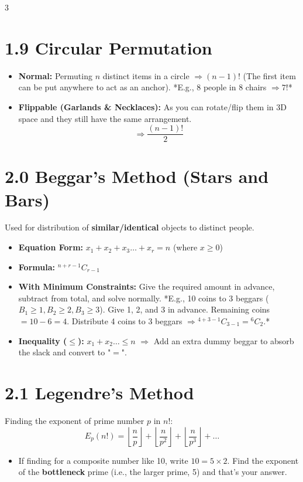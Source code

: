 \documentclass[11pt,a4paper,landscape]{article}
\begin{document}
\begin{multicols*}{3}
\section*{1.9 Circular Permutation}
\begin{itemize}
\item \textbf{Normal:} Permuting $n$ distinct items in a circle $\Rightarrow (n-1)!$ (The first item can be put anywhere to act as an anchor).
  *E.g., 8 people in 8 chairs $\Rightarrow 7!$*
\item \textbf{Flippable (Garlands \& Necklaces):} As you can rotate/flip them in 3D space and they still have the same arrangement.
  $$\Rightarrow \frac{(n-1)!}{2}$$
\end{itemize}

\section*{2.0 Beggar's Method (Stars and Bars)}
Used for distribution of \textbf{similar/identical} objects to distinct people.
\begin{itemize}
\item \textbf{Equation Form:} $x_1 + x_2 + x_3 \dots + x_r = n$ (where $x \ge 0$)
\item \textbf{Formula:} ${}^{n+r-1}C_{r-1}$
\item \textbf{With Minimum Constraints:} Give the required amount in advance, subtract from total, and solve normally.
  *E.g., 10 coins to 3 beggars ($B_1 \ge 1, B_2 \ge 2, B_3 \ge 3$). Give 1, 2, and 3 in advance. Remaining coins $= 10 - 6 = 4$. Distribute 4 coins to 3 beggars $\Rightarrow {}^{4+3-1}C_{3-1} = {}^6C_2$.*
\item \textbf{Inequality ($\le$):} $x_1 + x_2 \dots \le n$ 
  $\Rightarrow$ Add an extra dummy beggar to absorb the slack and convert to "$=$".
\end{itemize}

\section*{2.1 Legendre's Method}
Finding the exponent of prime number $p$ in $n!$:
$$ E_p(n!) = \left\lfloor \frac{n}{p} \right\rfloor + \left\lfloor \frac{n}{p^2} \right\rfloor + \left\lfloor \frac{n}{p^3} \right\rfloor + \dots $$
\begin{itemize}
\item If finding for a composite number like 10, write $10 = 5 \times 2$. Find the exponent of the \textbf{bottleneck} prime (i.e., the larger prime, 5) and that's your answer.
\end{itemize}


\end{multicols*}
\end{document}
